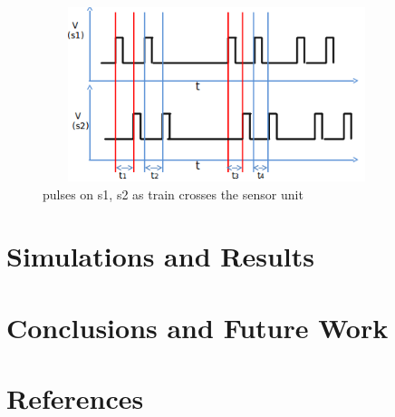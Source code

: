 \documentclass[titlepage]{article}
\begin{document}
\begin{figure}[H]
\begin{center}
\includegraphics[height = 2in,width=4in,angle=00]{figures/8w_no_miss.png}
\caption{\small pulses on s1, s2 as train crosses the sensor unit}
\label{fig:netLayout}
\end{center}
\end{figure}

\section{Simulations and Results}

\section{Conclusions and Future Work}

\section{References}
\end{document}
